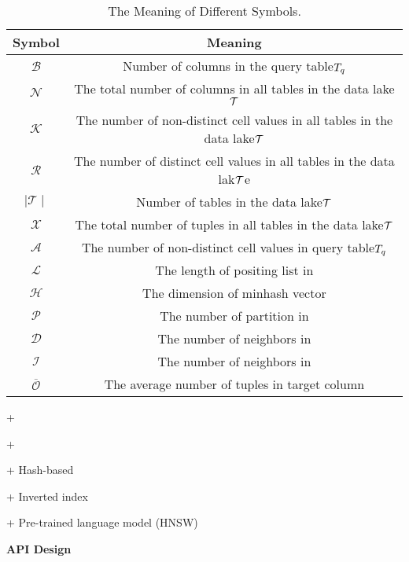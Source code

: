 \begin{table*}[!ht]
	\centering
	\caption{The Meaning of Different Symbols.}
	\begin{tabular}{cc}
		\hline
		Symbol & Meaning \\ \hline
		$\mathcal{B}$ & Number of columns in the query table$T_q$  \\
		$\mathcal{N}$ &The total number of columns in all tables in the data lake$\mathcal{T}$ \\
		$\mathcal{K}$ & The number of non-distinct cell values in all tables in the data lake$\mathcal{T}$   \\
		$\mathcal{R}$ &The number of distinct cell values in all tables in the data lak$\mathcal{T}$e \\
		$\mid \mathcal{T} \mid$ & Number of tables in the data lake$\mathcal{T}$  \\
		$\mathcal{X}$ &The total number of tuples in all tables in the data lake$\mathcal{T}$ \\
		$\mathcal{A}$ & The number of non-distinct cell values in query table$T_q$  \\
		
		$\mathcal{L}$ & The length of positing list in \josie  \\
		$\mathcal{H}$ & The dimension of minhash vector \\
		$\mathcal{P}$ & The number of partition in \lsh\\
		$\mathcal{D}$ & The number of neighbors in \dlll\\
		$\mathcal{I}$ & The number of neighbors in \infogather\\
		$\overline{\mathcal{O}}$ & The average number of tuples in target column\\






	
	\end{tabular}
	\label{symbol_table}
\end{table*}

+ 

+ 

+ Hash-based

+ Inverted index 

+ Pre-trained language model (HNSW)


\noindent\textbf{API Design}

